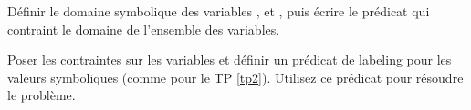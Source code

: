 \begin{question}
  Définir le domaine symbolique des variables ,  et , puis écrire le prédicat qui contraint
  le domaine de l'ensemble des variables.  
\end{question}

\begin{question} 
  Poser les contraintes sur les variables et définir un prédicat de labeling pour les valeurs symboliques (comme pour le TP \ref{tp2}). Utilisez ce prédicat pour résoudre le problème.
\end{question}





